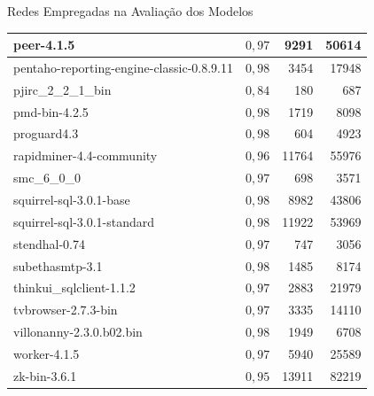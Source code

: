\begin{chapter}{Redes Empregadas na Avaliação dos Modelos}
\begin{center}
\begin{longtable}{| p{10cm} | c | r | r |}
	peer-4.1.5 &  $0,97$ & 9291 & 50614 \\ \hline
	pentaho-reporting-engine-classic-0.8.9.11 &  $0,98$ & 3454 & 17948 \\ \hline
	pjirc\_2\_2\_1\_bin &  $0,84$ & 180 & 687 \\ \hline
	pmd-bin-4.2.5 &  $0,98$ & 1719 & 8098 \\ \hline
	proguard4.3 &  $0,98$ & 604 & 4923 \\ \hline
	rapidminer-4.4-community &  $0,96$ & 11764 & 55976 \\ \hline
	smc\_6\_0\_0 &  $0,97$ & 698 & 3571 \\ \hline
	squirrel-sql-3.0.1-base &  $0,98$ & 8982 & 43806 \\ \hline
	squirrel-sql-3.0.1-standard &  $0,98$ & 11922 & 53969 \\ \hline
	stendhal-0.74 &  $0,97$ & 747 & 3056 \\ \hline
	subethasmtp-3.1 &  $0,98$ & 1485 & 8174 \\ \hline
	thinkui\_sqlclient-1.1.2 &  $0,97$ & 2883 & 21979 \\ \hline
	tvbrowser-2.7.3-bin &  $0,97$ & 3335 & 14110 \\ \hline
	villonanny-2.3.0.b02.bin &  $0,98$ & 1949 & 6708 \\ \hline
	worker-4.1.5 &  $0,97$ & 5940 & 25589 \\ \hline
	zk-bin-3.6.1 &  $0,95$ & 13911 & 82219 \\ \hline
	
\end{longtable}
\end{center}



\end{chapter}
